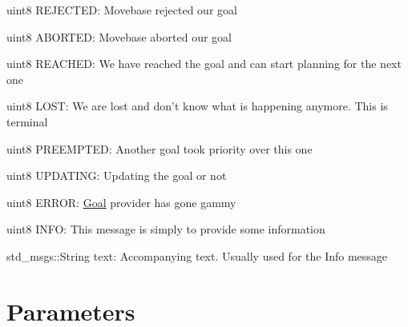 \begin{DoxyItemize}
\item uint8 \-R\-E\-J\-E\-C\-T\-E\-D\-: \-Movebase rejected our goal
\end{DoxyItemize}


\begin{DoxyItemize}
\item uint8 \-A\-B\-O\-R\-T\-E\-D\-: \-Movebase aborted our goal
\end{DoxyItemize}


\begin{DoxyItemize}
\item uint8 \-R\-E\-A\-C\-H\-E\-D\-: \-We have reached the goal and can start planning for the next one
\end{DoxyItemize}


\begin{DoxyItemize}
\item uint8 \-L\-O\-S\-T\-: \-We are lost and don't know what is happening anymore. \-This is terminal
\end{DoxyItemize}


\begin{DoxyItemize}
\item uint8 \-P\-R\-E\-E\-M\-P\-T\-E\-D\-: \-Another goal took priority over this one
\end{DoxyItemize}


\begin{DoxyItemize}
\item uint8 \-U\-P\-D\-A\-T\-I\-N\-G\-: \-Updating the goal or not
\end{DoxyItemize}


\begin{DoxyItemize}
\item uint8 \-E\-R\-R\-O\-R\-: \hyperlink{classGoal}{\-Goal} provider has gone gammy
\end{DoxyItemize}


\begin{DoxyItemize}
\item uint8 \-I\-N\-F\-O\-: \-This message is simply to provide some information
\end{DoxyItemize}

std\-\_\-msgs\-::\-String text\-: \-Accompanying text. \-Usually used for the \-Info message \hypertarget{index_parameters}{}\section{\-Parameters}\label{index_parameters}


